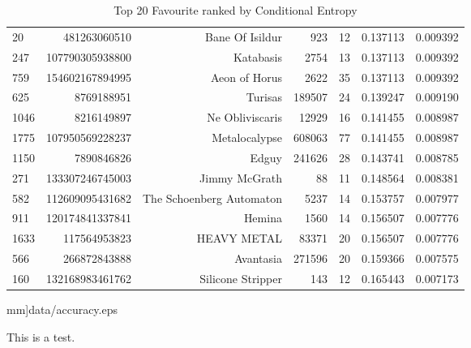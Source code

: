 \documentclass[letterpaper]{article}
\begin{document}
\begin{figure}
\begin{table}
\begin{tabular}{| >{\small}l | >{\small}r | >{\small}r | >{\small}r | >{\small}r | >{\small}r |>{\small}r |}
20   &     481263060510 &           Bane Of Isildur &     923 &       12 &             0.137113 &            0.009392 \\
247  &  107790305938800 &                 Katabasis &    2754 &       13 &             0.137113 &            0.009392 \\
759  &  154602167894995 &             Aeon of Horus &    2622 &       35 &             0.137113 &            0.009392 \\
625  &       8769188951 &                   Turisas &  189507 &       24 &             0.139247 &            0.009190 \\
1046 &       8216149897 &           Ne Obliviscaris &   12929 &       16 &             0.141455 &            0.008987 \\
1775 &  107950569228237 &             Metalocalypse &  608063 &       77 &             0.141455 &            0.008987 \\
1150 &       7890846826 &                     Edguy &  241626 &       28 &             0.143741 &            0.008785 \\
271  &  133307246745003 &             Jimmy McGrath &      88 &       11 &             0.148564 &            0.008381 \\
582  &  112609095431682 &  The Schoenberg Automaton &    5237 &       14 &             0.153757 &            0.007977 \\
911  &  120174841337841 &                    Hemina &    1560 &       14 &             0.156507 &            0.007776 \\
1633 &     117564953823 &               HEAVY METAL &   83371 &       20 &             0.156507 &            0.007776 \\
566  &     266872843888 &                 Avantasia &  271596 &       20 &             0.159366 &            0.007575 \\
160  &  132168983461762 &         Silicone Stripper &     143 &       12 &             0.165443 &            0.007173 \\
\hline
\end{tabular}
\caption{Top 20 Favourite ranked by Conditional Entropy}
\label {Top 20 Favourite ranked by Conditional Entropy}
\end{table}
	mm]{data/accuracy.eps}
	\caption{This is a test.}
\end{figure}
\end{document}
